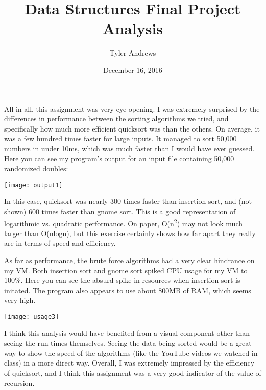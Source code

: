 \documentclass{article}
\title{\vspace{-3cm}Data Structures Final Project Analysis}
\author{\vspace{-3mm}Tyler Andrews}
\date{\vspace{-3mm}December 16, 2016\vspace{-3mm}}
\begin{document}
\maketitle

All in all, this assignment was very eye opening. I was extremely surprised by the differences in performance between the sorting algorithms we tried, and specifically how much more efficient quicksort was than the others. On average, it was a few hundred times faster for large inputs. It managed to sort 50,000 numbers in under 10ms, which was much faster than I would have ever guessed. Here you can see my program's output for an input file containing 50,000 randomized doubles:

\vspace{3mm}
\centerline{\texttt{[image: output1]}}

\flushleft

In this case, quicksort was nearly 300 times faster than insertion sort, and (not shown) 600 times faster than gnome sort. This is a good representation of logarithmic vs. quadratic performance. On paper, O(n\textsuperscript{2}) may not look much larger than O(nlogn), but this exercise certainly shows how far apart they really are in terms of speed and efficiency.

\vspace{3mm}

\qquad
As far as performance, the brute force algorithms had a very clear hindrance on my VM. Both insertion sort and gnome sort spiked CPU usage for my VM to 100\%. Here you can see the absurd spike in resources when insertion sort is initated. The program also appears to use about 800MB of RAM, which seems very high.

\vspace{3mm}
\centerline{\texttt{[image: usage3]}}
\vspace{3mm}

\qquad
I think this analysis would have benefited from a visual component other than seeing the run times themselves. Seeing the data being sorted would be a great way to show the speed of the algorithms (like the YouTube videos we watched in class) in a more direct way. Overall, I was extremely impressed by the efficiency of quicksort, and I think this assignment was a very good indicator of the value of recursion.
\end{document}
